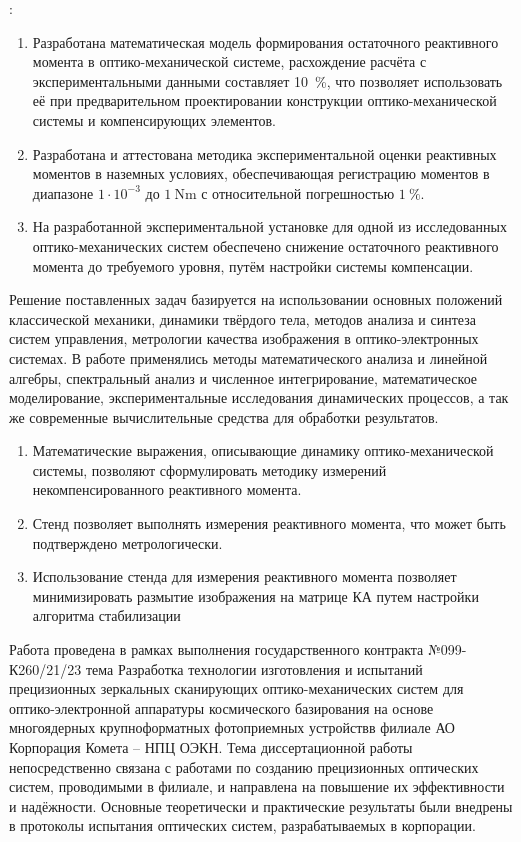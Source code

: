 {\influence}:

\begin{enumerate}[beginpenalty=10000] %
	\item Разработана математическая модель формирования остаточного реактивного момента в оптико-механической системе, расхождение расчёта с экспериментальными данными составляет 10~\%, что позволяет использовать её при предварительном проектировании конструкции оптико-механической системы и компенсирующих элементов.
	\item Разработана и аттестована методика экспериментальной оценки реактивных моментов в наземных условиях, обеспечивающая регистрацию моментов в диапазоне $1 \cdot 10^{-3}$ до $\SI{1}{\newton\meter}$ с относительной погрешностью $1 ~\%$.
	\item На разработанной экспериментальной установке для одной из исследованных оптико-механических систем обеспечено снижение остаточного реактивного момента до требуемого уровня, путём настройки системы компенсации.
\end{enumerate}


{\methods} Решение поставленных задач базируется на использовании основных положений классической механики, динамики твёрдого тела, методов анализа и синтеза систем управления, метрологии качества изображения в оптико-электронных системах. В работе применялись методы математического анализа и линейной алгебры, спектральный анализ и численное интегрирование, математическое моделирование, экспериментальные исследования динамических процессов, а так же современные вычислительные средства для обработки результатов.


{}
\begin{enumerate}[beginpenalty=10000] %
  \item Математические выражения, описывающие динамику оптико-механической системы, позволяют сформулировать методику измерений некомпенсированного реактивного момента.
  \item Стенд позволяет выполнять измерения реактивного момента, что может быть подтверждено метрологически.
  \item Использование стенда для измерения реактивного момента позволяет минимизировать размытие изображения на матрице КА путем настройки алгоритма стабилизации
\end{enumerate}

{\realisation} Работа проведена в рамках выполнения государственного контракта №099-К260/21/23 тема \flqq Разработка технологии изготовления и испытаний прецизионных зеркальных сканирующих оптико-механических систем для оптико-электронной аппаратуры космического базирования на основе многоядерных крупноформатных фотоприемных устройств\frqq  в филиале АО \flqq Корпорация \glqq Комета \grqq -- \glqq НПЦ ОЭКН\grqq \frqq. Тема диссертационной работы непосредственно связана с работами по созданию прецизионных оптических систем, проводимыми в филиале, и направлена на повышение их эффективности и надёжности. Основные теоретически и практические результаты были внедрены в протоколы испытания оптических систем, разрабатываемых в корпорации.

